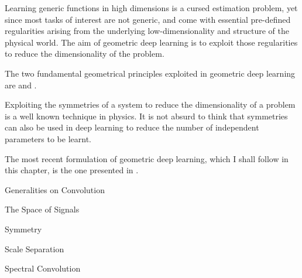 \documentclass[../main.tex]{subfiles}
\begin{document}
    Learning generic functions in high dimensions is a cursed estimation
    problem, yet since most tasks of interest are not generic, and come with essential
    pre-defined regularities arising from the underlying low-dimensionality
    and structure of the physical world. 
    The aim of geometric deep learning is to exploit those regularities to reduce the dimensionality of the problem.

    The two fundamental geometrical principles exploited in geometric deep learning are  and .

    Exploiting the symmetries of a system to reduce the dimensionality of a problem is a well known 
    technique in physics. It is not absurd to think that symmetries can also be used in deep learning
    to reduce the number of independent parameters to be learnt.

    The most recent formulation of geometric deep learning, which I shall follow in this chapter, is the one presented in \cite{2021geo}. 

    \begin{section}{Generalities on Convolution}
        \label{sec:3:1}
           
    \end{section}
    \begin{section}{The Space of Signals}
           
    \end{section}
    \begin{section}{Symmetry}
           
    \end{section}
    \begin{section}{Scale Separation}
           
    \end{section}
    \begin{section}{Spectral Convolution}
           
    \end{section}
\end{document}
